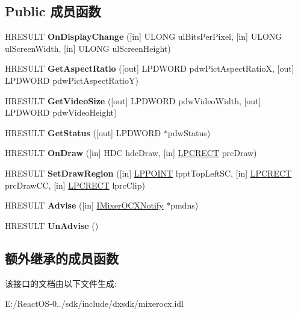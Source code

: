 \subsection*{Public 成员函数}
\begin{DoxyCompactItemize}
\item 
\mbox{\label{interface_i_mixer_o_c_x_adc8bdf0e57937121af5695a0b3ed132b}} 
H\+R\+E\+S\+U\+LT {\bfseries On\+Display\+Change} (\mbox{[}in\mbox{]} U\+L\+O\+NG ul\+Bits\+Per\+Pixel, \mbox{[}in\mbox{]} U\+L\+O\+NG ul\+Screen\+Width, \mbox{[}in\mbox{]} U\+L\+O\+NG ul\+Screen\+Height)
\item 
\mbox{\label{interface_i_mixer_o_c_x_a3625a0a55113e354065b6be49ee0fe65}} 
H\+R\+E\+S\+U\+LT {\bfseries Get\+Aspect\+Ratio} (\mbox{[}out\mbox{]} L\+P\+D\+W\+O\+RD pdw\+Pict\+Aspect\+RatioX, \mbox{[}out\mbox{]} L\+P\+D\+W\+O\+RD pdw\+Pict\+Aspect\+RatioY)
\item 
\mbox{\label{interface_i_mixer_o_c_x_a9f167ddec4d48134574eb05023181483}} 
H\+R\+E\+S\+U\+LT {\bfseries Get\+Video\+Size} (\mbox{[}out\mbox{]} L\+P\+D\+W\+O\+RD pdw\+Video\+Width, \mbox{[}out\mbox{]} L\+P\+D\+W\+O\+RD pdw\+Video\+Height)
\item 
\mbox{\label{interface_i_mixer_o_c_x_aef82cbe5286f5101ecd1c44c9ac0cddf}} 
H\+R\+E\+S\+U\+LT {\bfseries Get\+Status} (\mbox{[}out\mbox{]} L\+P\+D\+W\+O\+RD $\ast$pdw\+Status)
\item 
\mbox{\label{interface_i_mixer_o_c_x_a03958fd6c116b309d78bc0c9353d55b3}} 
H\+R\+E\+S\+U\+LT {\bfseries On\+Draw} (\mbox{[}in\mbox{]} H\+DC hdc\+Draw, \mbox{[}in\mbox{]} \hyperlink{structtag_r_e_c_t}{L\+P\+C\+R\+E\+CT} prc\+Draw)
\item 
\mbox{\label{interface_i_mixer_o_c_x_aa5308e7d090912030d4e9513955af936}} 
H\+R\+E\+S\+U\+LT {\bfseries Set\+Draw\+Region} (\mbox{[}in\mbox{]} \hyperlink{structtag_p_o_i_n_t}{L\+P\+P\+O\+I\+NT} lppt\+Top\+Left\+SC, \mbox{[}in\mbox{]} \hyperlink{structtag_r_e_c_t}{L\+P\+C\+R\+E\+CT} prc\+Draw\+CC, \mbox{[}in\mbox{]} \hyperlink{structtag_r_e_c_t}{L\+P\+C\+R\+E\+CT} lprc\+Clip)
\item 
\mbox{\label{interface_i_mixer_o_c_x_a0491d7cc28975a385dd9a91c85b8feb4}} 
H\+R\+E\+S\+U\+LT {\bfseries Advise} (\mbox{[}in\mbox{]} \hyperlink{interface_i_mixer_o_c_x_notify}{I\+Mixer\+O\+C\+X\+Notify} $\ast$pmdns)
\item 
\mbox{\label{interface_i_mixer_o_c_x_ab13898ff69f32377e28565dae48f8c2e}} 
H\+R\+E\+S\+U\+LT {\bfseries Un\+Advise} ()
\end{DoxyCompactItemize}
\subsection*{额外继承的成员函数}


该接口的文档由以下文件生成\+:\begin{DoxyCompactItemize}
\item 
E\+:/\+React\+O\+S-\/0../sdk/include/dxsdk/mixerocx.\+idl\end{DoxyCompactItemize}
